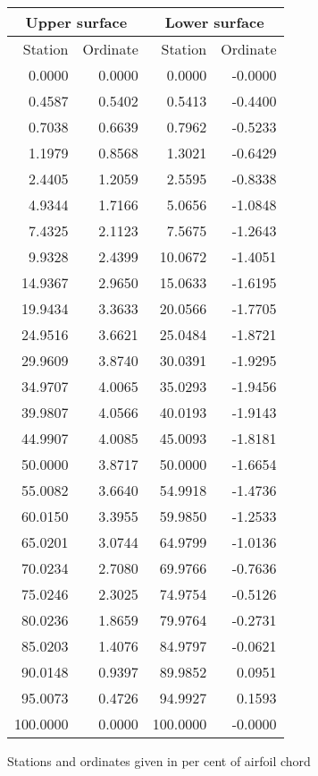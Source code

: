 \documentclass[11pt]{book}
\begin{document}
 \hspace{4mm}
 \begin{tabular}{|r|r|r|r|} \hline 
 \multicolumn{2}{|c|}{Upper surface} & \multicolumn{2}{|c|}{Lower surface} \\
 \hline
 Station & Ordinate & Station & Ordinate \\
 \hline
0.0000 & 0.0000 & 0.0000 & -0.0000 \\
0.4587 & 0.5402 & 0.5413 & -0.4400 \\
0.7038 & 0.6639 & 0.7962 & -0.5233 \\
1.1979 & 0.8568 & 1.3021 & -0.6429 \\
2.4405 & 1.2059 & 2.5595 & -0.8338 \\
4.9344 & 1.7166 & 5.0656 & -1.0848 \\
7.4325 & 2.1123 & 7.5675 & -1.2643 \\
9.9328 & 2.4399 & 10.0672 & -1.4051 \\
14.9367 & 2.9650 & 15.0633 & -1.6195 \\
19.9434 & 3.3633 & 20.0566 & -1.7705 \\
24.9516 & 3.6621 & 25.0484 & -1.8721 \\
29.9609 & 3.8740 & 30.0391 & -1.9295 \\
34.9707 & 4.0065 & 35.0293 & -1.9456 \\
39.9807 & 4.0566 & 40.0193 & -1.9143 \\
44.9907 & 4.0085 & 45.0093 & -1.8181 \\
50.0000 & 3.8717 & 50.0000 & -1.6654 \\
55.0082 & 3.6640 & 54.9918 & -1.4736 \\
60.0150 & 3.3955 & 59.9850 & -1.2533 \\
65.0201 & 3.0744 & 64.9799 & -1.0136 \\
70.0234 & 2.7080 & 69.9766 & -0.7636 \\
75.0246 & 2.3025 & 74.9754 & -0.5126 \\
80.0236 & 1.8659 & 79.9764 & -0.2731 \\
85.0203 & 1.4076 & 84.9797 & -0.0621 \\
90.0148 & 0.9397 & 89.9852 & 0.0951 \\
95.0073 & 0.4726 & 94.9927 & 0.1593 \\
100.0000 & 0.0000 & 100.0000 & -0.0000 \\
 \hline 
 \end{tabular}
 \vspace{8mm}

Stations and ordinates given in per cent of airfoil chord
\end{document}
